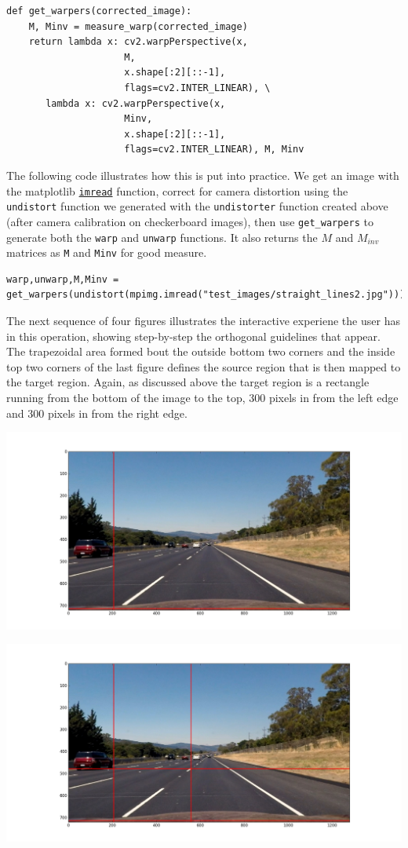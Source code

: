 \documentclass[11pt]{article}
\begin{document}
\begin{verbatim}
def get_warpers(corrected_image):
    M, Minv = measure_warp(corrected_image)
    return lambda x: cv2.warpPerspective(x,
					 M,
					 x.shape[:2][::-1],
					 flags=cv2.INTER_LINEAR), \
	   lambda x: cv2.warpPerspective(x,
					 Minv,
					 x.shape[:2][::-1],
					 flags=cv2.INTER_LINEAR), M, Minv
\end{verbatim}

The following code illustrates how this is put into practice.
We get an image with the matplotlib \href{http://matplotlib.org/api/image_api.html#matplotlib.image.imread}{\texttt{imread}} function, correct
for camera distortion using the \texttt{undistort} function we
generated with the \texttt{undistorter} function created above (after
camera calibration on checkerboard images), then use
\texttt{get\_warpers} to generate both the \texttt{warp} and \texttt{unwarp}
functions.  It also returns the $M$ and $M_{inv}$ matrices as
\texttt{M} and \texttt{Minv} for good measure.

\begin{verbatim}
warp,unwarp,M,Minv = get_warpers(undistort(mpimg.imread("test_images/straight_lines2.jpg")))
\end{verbatim}

The next sequence of four figures illustrates the interactive
experiene the user has in this operation, showing step-by-step
the orthogonal guidelines that appear.  The trapezoidal area
formed bout the outside bottom two corners and the inside top
two corners of the last figure defines the source region that is
then mapped to the target region.  Again, as discussed above the
target region is a rectangle running from the bottom of the
image to the top, 300 pixels in from the left edge and 300
pixels in from the right edge.

\includegraphics[width=.9\linewidth]{output_images/figure_3-1.png}

\includegraphics[width=.9\linewidth]{output_images/figure_3-2.png}
\end{document}
